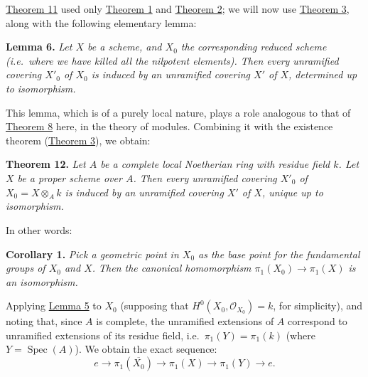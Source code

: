 \documentclass{article}
\newenvironment{itenv}[1]
  {\phantomsection\par\smallskip\noindent\textbf{#1.}\itshape}
  {\par\smallskip}
\theoremstyle{definition}
\theoremstyle{definition}
\theoremstyle{definition}
\theoremstyle{definition}
\theoremstyle{remark}
\begin{document}
\protect\hyperlink{fga-2-theorem-11}{Theorem 11} used only \protect\hyperlink{fga-2-theorem-1}{Theorem 1} and \protect\hyperlink{fga-2-theorem-2}{Theorem 2};
we will now use \protect\hyperlink{fga-2-theorem-3}{Theorem 3}, along with the following elementary lemma:

\leavevmode{}%
\begin{itenv}{Lemma 6}
Let \(X\) be a scheme, and \(X_0\) the corresponding reduced scheme (i.e.~where we have killed all the nilpotent elements).
Then every unramified covering \(X'_0\) of \(X_0\) is induced by an unramified covering \(X'\) of \(X\), determined up to isomorphism.

\end{itenv}

This lemma, which is of a purely local nature, plays a role analogous to that of \protect\hyperlink{fga-2-theorem-8}{Theorem 8} here, in the theory of modules.
Combining it with the existence theorem (\protect\hyperlink{fga-2-theorem-3}{Theorem 3}), we obtain:

\leavevmode{}%
\begin{itenv}{Theorem 12}
Let \(A\) be a complete local Noetherian ring with residue field \(k\).
Let \(X\) be a proper scheme over \(A\).
Then every unramified covering \(X'_0\) of \(X_0=X\otimes_Ak\) is induced by an unramified covering \(X'\) of \(X\), unique up to isomorphism.

\end{itenv}

In other words:

\leavevmode{}%
\begin{itenv}{Corollary 1}
Pick a geometric point in \(X_0\) as the base point for the fundamental groups of \(X_0\) and \(X\).
Then the canonical homomorphism \(\pi_1(X_0)\to\pi_1(X)\) is an \emph{isomorphism}.

\end{itenv}

Applying \protect\hyperlink{fga-2-lemma-5}{Lemma 5} to \(X_0\) (supposing that \(H^0(X_0,{\mathscr{O}}_{X_0})=k\), for simplicity), and noting that, since \(A\) is complete, the unramified extensions of \(A\) correspond to unramified extensions of its residue field, i.e.~\(\pi_1(Y)=\pi_1(k)\) (where \(Y=\operatorname{Spec}(A)\)).
We obtain the exact sequence:
\[
  e \to \pi_1(\overline{X_0}) \to \pi_1(X) \to \pi_1(Y) \to e.
\]
\end{document}
